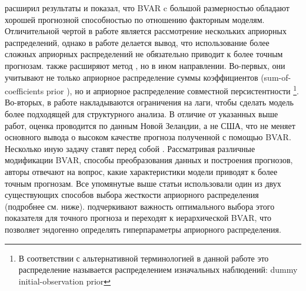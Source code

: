 \documentclass[11pt]{article} %
\begin{document}
\cite{koop_2013} расширил результаты \cite{banbura_al_2010}  и показал, что BVAR c большой размерностью обладают хорошей прогнозной способностью  по отношению  факторным моделям. Отличительной чертой в работе является рассмотрение нескольких априорных распределений, однако в работе делается вывод, что использование более сложных априорных распределений не обязательно приводит к более точным прогнозам. 
\cite{bloor_matheson_2010} также расширяют метод \cite{banbura_al_2010}, но в ином направлении. Во-первых, они учитывают не только априорное распределение суммы коэффициентов (sum-of-coefficients prior \cite{sims_1992}), но и априорное распределение совместной персистентности \footnote{В соответствии с альтернативной терминологией в данной работе это распределение называется распределением изначальных наблюдений: dummy initial-observation prior}\cite{sims_1993}. Во-вторых, в работе накладываются ограничения на лаги, чтобы сделать модель более подходящей для структурного анализа.  В отличие от указанных выше работ, оценка проводится по данным  Новой Зеландии, а не США, что не меняет основного вывода о высоком качестве прогноза полученной с помощью BVAR. 
Несколько иную задачу ставят перед собой \cite{carriro_al_2015}. Рассматривая различные модификации BVAR, способы преобразования данных и построения прогнозов, авторы отвечают на вопрос, какие характеристики модели приводят к более точным прогнозам. 
Все упомянутые выше статьи использовали один из двух существующих способов выбора жесткости априорного распределения (подробнее см. ниже). \cite{giannone_al_2015} подчеркивают важность оптимального выбора этого показателя для точного прогноза и переходят к иерархической BVAR, что позволяет эндогенно определять  гиперпараметры априорного распределения. 
\end{document}
